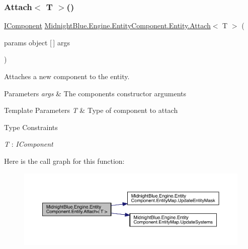 \subsubsection{\texorpdfstring{Attach$<$ T $>$()}{Attach< T >()}}
{\footnotesize\ttfamily \hyperlink{interface_midnight_blue_1_1_engine_1_1_entity_component_1_1_i_component}{I\+Component} \hyperlink{class_midnight_blue_1_1_engine_1_1_entity_component_1_1_entity_a03dd4fbb29f2a0be51589726304725df}{Midnight\+Blue.\+Engine.\+Entity\+Component.\+Entity.\+Attach}$<$ T $>$ (\begin{DoxyParamCaption}\item[{params object \mbox{[}$\,$\mbox{]}}]{args }\end{DoxyParamCaption})\hspace{0.3cm}{\ttfamily [inline]}}



Attaches a new component to the entity. 


\begin{DoxyParams}{Parameters}
{\em args} & The components constructor arguments\\
\hline
\end{DoxyParams}

\begin{DoxyTemplParams}{Template Parameters}
{\em T} & Type of component to attach\\
\hline
\end{DoxyTemplParams}
\begin{Desc}
\item[Type Constraints]\begin{description}
\item[{\em T} : {\em I\+Component}]\end{description}
\end{Desc}
Here is the call graph for this function\+:
\nopagebreak
\begin{figure}[H]
\begin{center}
\leavevmode
\includegraphics[width=350pt]{class_midnight_blue_1_1_engine_1_1_entity_component_1_1_entity_ac0f755703d44843aff237147fa2f49ff_cgraph}
\end{center}
\end{figure}
\hypertarget{class_midnight_blue_1_1_engine_1_1_entity_component_1_1_entity_ab5b2a5d043014c5c4b3e97562df9f76a}{}\label{class_midnight_blue_1_1_engine_1_1_entity_component_1_1_entity_ab5b2a5d043014c5c4b3e97562df9f76a} 
